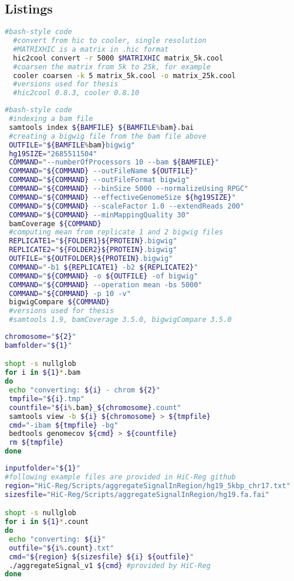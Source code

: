 \clearpage
\subsection{Listings}
\begin{lstlisting}[language=bash, caption=Hic to cooler, label=list:methods:hic2cool]
  #bash-style code
  #convert from hic to cooler, single resolution
  #MATRIXHIC is a matrix in .hic format
  hic2cool convert -r 5000 $MATRIXHIC matrix_5k.cool
  #coarsen the matrix from 5k to 25k, for example
  cooler coarsen -k 5 matrix_5k.cool -o matrix_25k.cool
  #versions used for thesis
  #hic2cool 0.8.3, cooler 0.8.10
\end{lstlisting}


\begin{lstlisting}[language=bash, caption=Bam to bigwig, label=list:methods:bamtobigwig]
 #bash-style code
 #indexing a bam file
 samtools index ${BAMFILE} ${BAMFILE%bam}.bai
 #creating a bigwig file from the bam file above
 OUTFILE="${BAMFILE%bam}bigwig"
 hg19SIZE="2685511504"
 COMMAND="--numberOfProcessors 10 --bam ${BAMFILE}" 
 COMMAND="${COMMAND} --outFileName ${OUTFILE}"
 COMMAND="${COMMAND} --outFileFormat bigwig" 
 COMMAND="${COMMAND} --binSize 5000 --normalizeUsing RPGC"
 COMMAND="${COMMAND} --effectiveGenomeSize ${hg19SIZE}"
 COMMAND="${COMMAND} --scaleFactor 1.0 --extendReads 200"
 COMMAND="${COMMAND} --minMappingQuality 30"
 bamCoverage ${COMMAND}
 #computing mean from replicate 1 and 2 bigwig files
 REPLICATE1="${FOLDER1}${PROTEIN}.bigwig"
 REPLICATE2="${FOLDER2}${PROTEIN}.bigwig"
 OUTFILE="${OUTFOLDER}${PROTEIN}.bigwig"
 COMMAND="-b1 ${REPLICATE1} -b2 ${REPLICATE2}"
 COMMAND="${COMMAND} -o ${OUTFILE} -of bigwig"
 COMMAND="${COMMAND} --operation mean -bs 5000"
 COMMAND="${COMMAND} -p 10 -v"
 bigwigCompare ${COMMAND}
 #versions used for thesis
 #samtools 1.9, bamCoverage 3.5.0, bigwigCompare 3.5.0
\end{lstlisting}

\begin{lstlisting}[language=bash, caption=Bam to bedgraph, label=list:methods:bam2bedgraph]
chromosome="${2}"
bamfolder="${1}"

shopt -s nullglob
for i in ${1}*.bam
do
 echo "converting: ${i} - chrom ${2}"
 tmpfile="${i}.tmp"
 countfile="${i%.bam}_${chromosome}.count"
 samtools view -b ${i} ${chromosome} > ${tmpfile}
 cmd="-ibam ${tmpfile} -bg"
 bedtools genomecov ${cmd} > ${countfile}
 rm ${tmpfile}
done
\end{lstlisting}
\begin{lstlisting}[language=bash, caption=Bedgraph to HiC-Reg input format, label=list:methods:bedgraph2hicreg]
inputfolder="${1}"
#following example files are provided in HiC-Reg github
region="HiC-Reg/Scripts/aggregateSignalInRegion/hg19_5kbp_chr17.txt"
sizesfile="HiC-Reg/Scripts/aggregateSignalInRegion/hg19.fa.fai"

shopt -s nullglob
for i in ${1}*.count
do
 echo "converting: ${i}"
 outfile="${i%.count}.txt"
 cmd="${region} ${sizesfile} ${i} ${outfile}"
 ./aggregateSignal_v1 ${cmd} #provided by HiC-Reg
done
\end{lstlisting}


